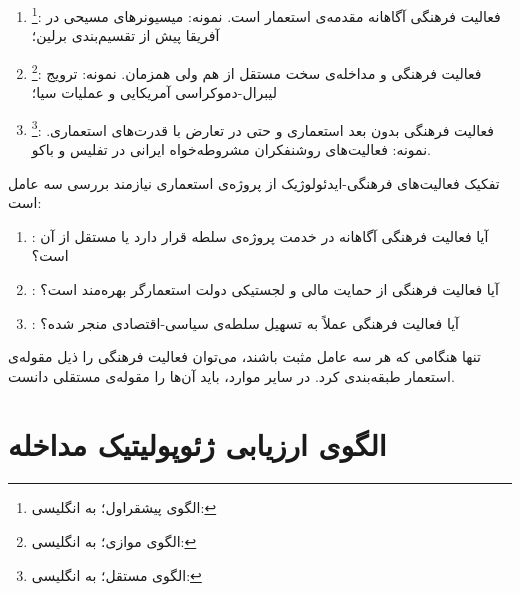 \begin{tcolorbox}[comparebox,
	title={سه الگوی رابطه‌ی فعالیت فرهنگی و مداخله‌ی سخت}]
	\begin{enumerate}[label=\textbf{\arabic*.}, nosep, rightmargin=1em]
		\item {}%
		\footnote{الگوی پیشقراول؛ به انگلیسی: }:
		فعالیت فرهنگی آگاهانه مقدمه‌ی استعمار است.
		نمونه: میسیونرهای مسیحی در آفریقا پیش از تقسیم‌بندی
		برلین؛
		\item {}%
		\footnote{الگوی موازی؛ به انگلیسی: }:
		فعالیت فرهنگی و مداخله‌ی سخت مستقل از هم ولی همزمان.
		نمونه: ترویج لیبرال-دموکراسی آمریکایی و عملیات سیا؛

\item {}%
\footnote{الگوی مستقل؛ به انگلیسی: }:
فعالیت فرهنگی بدون بعد استعماری و حتی در تعارض با قدرت‌های
استعماری. نمونه: فعالیت‌های روشنفکران مشروطه‌خواه ایرانی
در تفلیس و باکو.
\end{enumerate}
\end{tcolorbox}

\begin{tcolorbox}[wavebox,
title={نکته‌ی تحلیلی: تفکیک میسیونری از استعمار}]
تفکیک فعالیت‌های فرهنگی-ایدئولوژیک از پروژه‌ی استعماری نیازمند
بررسی سه عامل است:
\begin{enumerate}[label=\textbf{\alph*.}, nosep, rightmargin=1em]
\item {}: آیا فعالیت فرهنگی آگاهانه در خدمت
پروژه‌ی سلطه قرار دارد یا مستقل از آن است؟
\item {}: آیا فعالیت فرهنگی از حمایت مالی و
لجستیکی دولت استعمارگر بهره‌مند است؟
\item {}: آیا فعالیت فرهنگی عملاً به تسهیل سلطه‌ی
سیاسی-اقتصادی منجر شده؟
\end{enumerate}
تنها هنگامی که هر سه عامل مثبت باشند، می‌توان فعالیت فرهنگی را
ذیل مقوله‌ی استعمار طبقه‌بندی کرد. در سایر موارد، باید آن‌ها را
مقوله‌ی مستقلی دانست.
\end{tcolorbox}


\section{الگوی ارزیابی ژئوپولیتیک مداخله}
\label{sec:ch04-geopolitical}

